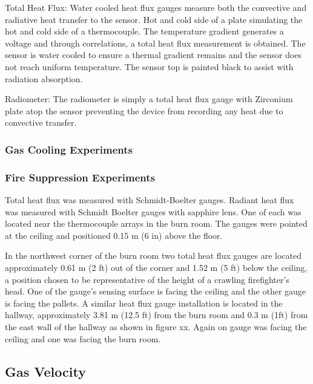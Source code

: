 \documentclass[12pt,oneside]{book}
\begin{document}
Total Heat Flux:
Water cooled heat flux gauges measure both the convective and radiative heat transfer to the sensor.  Hot and cold side of a plate simulating the hot and cold side of a thermocouple.  The temperature gradient generates a voltage and through correlations, a total heat flux measurement is obtained.  The sensor is water cooled to ensure a thermal gradient remains and the sensor does not reach uniform temperature.  The sensor top is painted black to assist with radiation absorption.

Radiometer:
The radiometer is simply a total heat flux gauge with Zirconium plate atop the sensor preventing the device from recording any heat due to convective transfer.


\subsubsection{Gas Cooling Experiments}
\label{subsubsec:Gas_Cooling_Heat_Flux_Instrumentation}

\subsubsection{Fire Suppression Experiments}
\label{subsubsec:Fire_Suppression_Heat_Flux_Instrumentation}

Total heat flux was measured with Schmidt-Boelter gauges.  Radiant heat flux was measured with Schmidt Boelter gauges with sapphire lens.  One of each was located near the thermocouple arrays in the burn room.  The gauges were pointed at the ceiling and positioned 0.15 m (6 in) above the floor.  

In the northwest corner of the burn room two total heat flux gauges are located approximately 0.61 m (2 ft) out of the corner and 1.52 m (5 ft) below the ceiling, a position chosen to be representative of the height of a crawling firefighter's head.  One of the gauge's sensing surface is facing the ceiling and the other gauge is facing the pallets.  A similar heat flux gauge installation is located in the hallway, approximately 3.81 m (12.5 ft) from the burn room and 0.3 m (1ft) from the east wall of the hallway as shown in figure xx.  Again on gauge was facing the ceiling and one was facing the burn room.  

\subsection{Gas Velocity}
\label{subsec:Gas_Velocity}
\end{document}
